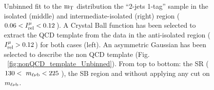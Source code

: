 {\begin{figure}[h!]


\caption{Unbinned fit to the ${\rm m_{T}}$ distribution the \textquotedblleft{}2-jets
1-tag\textquotedblright{} sample in the isolated (middle) and intermediate-isolated (right) region ($0.06 < I_{\rm rel}^{\mu} < 0.12$).
A Crystal Ball function has been selected to extract the QCD template
from the data in the anti-isolated region ($I_{\rm rel}^{\mu} > 0.12$) for both cases (left). An asymmetric
Gaussian has been selected to describe the non QCD template (Fig. ~\ref{fig:nonQCD_template_Unbinned}). From top to bottom: the SR ($130<\
m_{\ell\nu \mathrm{b}}<225\,$\GeV), the SB region and without applying any cut on $m_{\ell\nu \mathrm{b}}$.}
\end{figure}


}

